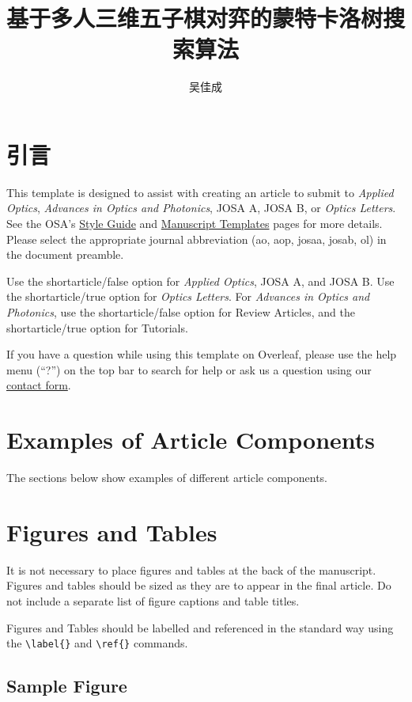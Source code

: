 \documentclass[9pt,twocolumn,twoside]{osajnl}
\title{基于多人三维五子棋对弈的蒙特卡洛树搜索算法}
\author[1]{吴佳成}
\affil[1]{南开大学，软件学院，软件工程专业，三班，1412649}
\begin{document}
\maketitle

\section{引言}

This template is designed to assist with creating an article to submit to \emph{Applied Optics}, \emph{Advances in Optics and Photonics}, JOSA A, JOSA B, or \emph{Optics Letters}. See the OSA's \href{http://www.opticsinfobase.org/submit/style/}{Style Guide} and \href{http://www.opticsinfobase.org/submit/templates/}{Manuscript Templates} pages for more details. Please select the appropriate journal abbreviation (ao, aop, josaa, josab, ol) in the document preamble.

Use the shortarticle/false option for \emph{Applied Optics}, JOSA A, and JOSA B. Use the shortarticle/true option for \emph{Optics Letters}. For \emph{Advances in Optics and Photonics}, use the shortarticle/false option for Review Articles, and the shortarticle/true option for Tutorials.

If you have a question while using this template on {Overleaf}, please use the help menu (``?'') on the top bar to search for help or ask us a question using our \href{https://www.overleaf.com/contact}{contact form}.

\section{Examples of Article Components}
\label{sec:examples}

The sections below show examples of different article components.

\section{Figures and Tables}

It is not necessary to place figures and tables at the back of the manuscript. Figures and tables should be sized as they are to appear in the final article. Do not include a separate list of figure captions and table titles.

Figures and Tables should be labelled and referenced in the standard way using the \verb|\label{}| and \verb|\ref{}| commands.

\subsection{Sample Figure}
\end{document}
